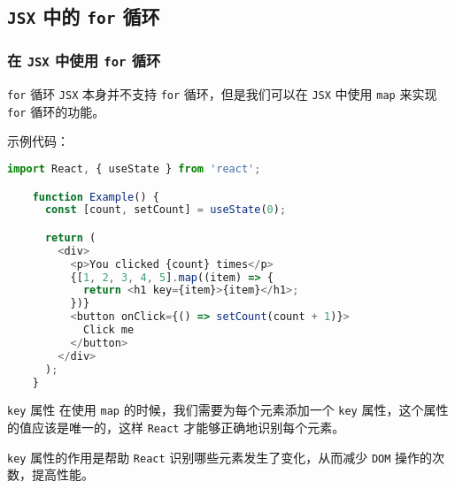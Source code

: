 \documentclass{beamer}
\begin{document}
\subsection{\texttt{JSX} 中的 \texttt{for} 循环}
\begin{frame}
  \frametitle{在 \texttt{JSX} 中使用 \texttt{for} 循环}

  \begin{block}{\texttt{for} 循环}
    \texttt{JSX} 本身并不支持 \texttt{for} 循环，但是我们可以在 \texttt{JSX} 中使用 \texttt{map} 来实现 \texttt{for} 循环的功能。
  \end{block}

  \framebreak

  示例代码：

  \begin{lstlisting}[language=JavaScript]
    import React, { useState } from 'react';

    function Example() {
      const [count, setCount] = useState(0);

      return (
        <div>
          <p>You clicked {count} times</p>
          {[1, 2, 3, 4, 5].map((item) => {
            return <h1 key={item}>{item}</h1>;
          })}
          <button onClick={() => setCount(count + 1)}>
            Click me
          </button>
        </div>
      );
    }
  \end{lstlisting}

  \framebreak

  \begin{alertblock}{\texttt{key} 属性}
    在使用 \texttt{map} 的时候，我们需要为每个元素添加一个 \texttt{key} 属性，这个属性的值应该是唯一的，这样 \texttt{React} 才能够正确地识别每个元素。

    \texttt{key} 属性的作用是帮助 \texttt{React} 识别哪些元素发生了变化，从而减少 \texttt{DOM} 操作的次数，提高性能。
  \end{alertblock}

\end{frame}
\end{document}
